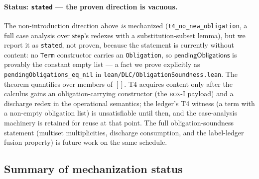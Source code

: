 \paragraph{Status: \texttt{stated} --- the proven direction is
vacuous.}
The non-introduction direction above \emph{is} mechanized
(\texttt{t4\_no\_new\_obligation}, a full case analysis over
$\mathsf{step}$'s redexes with a substitution-subset lemma), but we
report it as \texttt{stated}, not proven, because the statement is
currently without content: no \texttt{Term} constructor carries an
\texttt{Obligation}, so $\mathsf{pendingObligations}$ is provably the
constant empty list --- a fact we prove explicitly as
\texttt{pendingObligations\_eq\_nil} in
\texttt{lean/DLC/ObligationSoundness.lean}.  The theorem quantifies
over members of $[]$.  T4 acquires content only after the calculus
gains an obligation-carrying constructor (the \textsc{box-I} payload)
and a discharge redex in the operational semantics; the ledger's T4
witness (a term with a non-empty obligation list) is unsatisfiable
until then, and the case-analysis machinery is retained for reuse at
that point.  The full obligation-soundness statement (multiset
multiplicities, discharge consumption, and the label-ledger fusion
property) is future work on the same schedule.

\subsection{Summary of mechanization status}

